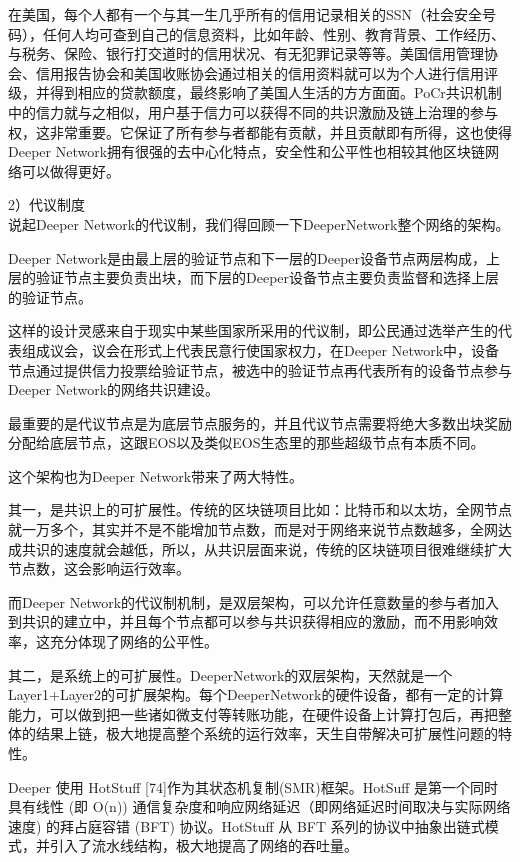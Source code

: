\documentclass[a4paper]{article}
\begin{document}
在美国，每个人都有一个与其一生几乎所有的信用记录相关的SSN（社会安全号码），任何人均可查到自己的信息资料，比如年龄、性别、教育背景、工作经历、与税务、保险、银行打交道时的信用状况、有无犯罪记录等等。美国信用管理协会、信用报告协会和美国收账协会通过相关的信用资料就可以为个人进行信用评级，并得到相应的贷款额度，最终影响了美国人生活的方方面面。PoCr共识机制中的信力就与之相似，用户基于信力可以获得不同的共识激励及链上治理的参与权，这非常重要。它保证了所有参与者都能有贡献，并且贡献即有所得，这也使得Deeper Network拥有很强的去中心化特点，安全性和公平性也相较其他区块链网络可以做得更好。

2）代议制度\\
说起Deeper Network的代议制，我们得回顾一下DeeperNetwork整个网络的架构。

Deeper Network是由最上层的验证节点和下一层的Deeper设备节点两层构成，上层的验证节点主要负责出块，而下层的Deeper设备节点主要负责监督和选择上层的验证节点。

这样的设计灵感来自于现实中某些国家所采用的代议制，即公民通过选举产生的代表组成议会，议会在形式上代表民意行使国家权力，在Deeper Network中，设备节点通过提供信力投票给验证节点，被选中的验证节点再代表所有的设备节点参与Deeper Network的网络共识建设。

最重要的是代议节点是为底层节点服务的，并且代议节点需要将绝大多数出块奖励分配给底层节点，这跟EOS以及类似EOS生态里的那些超级节点有本质不同。

这个架构也为Deeper Network带来了两大特性。

其一，是共识上的可扩展性。传统的区块链项目比如：比特币和以太坊，全网节点就一万多个，其实并不是不能增加节点数，而是对于网络来说节点数越多，全网达成共识的速度就会越低，所以，从共识层面来说，传统的区块链项目很难继续扩大节点数，这会影响运行效率。

⽽Deeper Network的代议制机制，是双层架构，可以允许任意数量的参与者加入到共识的建立中，并且每个节点都可以参与共识获得相应的激励，而不用影响效率，这充分体现了网络的公平性。

其二，是系统上的可扩展性。DeeperNetwork的双层架构，天然就是一个Layer1+Layer2的可扩展架构。每个DeeperNetwork的硬件设备，都有一定的计算能力，可以做到把一些诸如微支付等转账功能，在硬件设备上计算打包后，再把整体的结果上链，极大地提高整个系统的运行效率，天生自带解决可扩展性问题的特性。


Deeper 使用 HotStuff [74]作为其状态机复制(SMR)框架。HotSuff 是第一个同时具有线性 (即 O(n)) 通信复杂度和响应网络延迟（即网络延迟时间取决与实际网络速度) 的拜占庭容错 (BFT) 协议。HotStuff 从 BFT 系列的协议中抽象出链式模式，并引入了流水线结构，极大地提高了网络的吞吐量。
\end{document}
